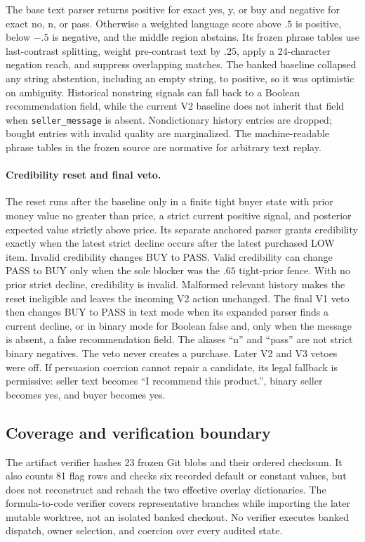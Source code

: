 The base text parser returns positive for exact yes, y, or buy and negative for
exact no, n, or pass. Otherwise a weighted language score above $.5$ is positive,
below $-.5$ is negative, and the middle region abstains. Its frozen phrase
tables use last-contrast splitting, weight pre-contrast text by $.25$, apply a
24-character negation reach, and suppress overlapping matches. The banked
baseline collapsed any string abstention, including an empty string, to
positive, so it was optimistic on ambiguity. Historical nonstring signals can
fall back to a Boolean recommendation field, while the current V2 baseline does
not inherit that field when \texttt{seller\_message} is absent. Nondictionary
history entries are dropped; bought entries with invalid quality are
marginalized. The machine-readable phrase tables in the frozen source are
normative for arbitrary text replay.

\paragraph{Credibility reset and final veto.}
The reset runs after the baseline only in a finite tight buyer state with prior
money value no greater than price, a strict current positive signal, and
posterior expected value strictly above price. Its separate anchored parser
grants credibility exactly when the latest strict decline occurs after the
latest purchased LOW item. Invalid credibility changes BUY to PASS. Valid
credibility can change PASS to BUY only when the sole blocker was the $.65$
tight-prior fence. With no prior strict decline, credibility is invalid.
Malformed relevant history makes the reset ineligible and leaves the incoming
V2 action unchanged. The final V1 veto then changes BUY to PASS in text mode
when its expanded parser finds a current decline, or in binary mode for Boolean
false and, only when the message is absent, a false recommendation field. The
aliases ``n'' and ``pass'' are not strict binary negatives. The veto never
creates a purchase. Later V2 and V3 vetoes were off. If persuasion coercion
cannot repair a candidate, its legal fallback is permissive: seller text becomes
``I recommend this product.'', binary seller becomes yes, and buyer becomes yes.

\subsection{Coverage and verification boundary}

The artifact verifier hashes 23 frozen Git blobs and their ordered checksum. It
also counts 81 flag rows and checks six recorded default or constant values, but
does not reconstruct and rehash the two effective overlay dictionaries. The
formula-to-code verifier covers representative branches while importing the
later mutable worktree, not an isolated banked checkout. No verifier executes
banked dispatch, owner selection, and coercion over every audited state.

